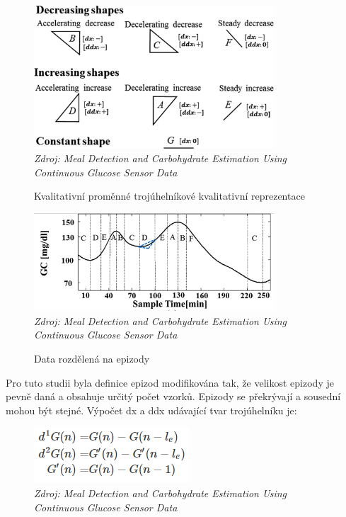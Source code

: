 \begin{figure}[H]
\caption{Kvalitativní proměnné trojúhelníkové kvalitativní reprezentace}
\label{fig:wavelet1}
\centering
\includegraphics[width=0.8\textwidth]{img/analyza/wavelet1.png}\\
\textit{Zdroj: Meal Detection and Carbohydrate Estimation Using Continuous Glucose Sensor Data \citep{Analyza.WaveletEst}}
\end{figure}
\begin{figure}[H]
\caption{Data rozdělená na epizody}
\label{fig:wavelet2}
\centering
\includegraphics[width=0.8\textwidth]{img/analyza/wavelet2.png}\\
\textit{Zdroj: Meal Detection and Carbohydrate Estimation Using Continuous Glucose Sensor Data \citep{Analyza.WaveletEst}}
\end{figure}

Pro tuto studii byla definice epizod modifikována tak, že velikost epizody je pevně daná a obsahuje určitý počet vzorků. Epizody se překrývají a sousední mohou být stejné. Výpočet dx a ddx udávající tvar trojúhelníku je:

\begin{figure}[H]
\label{fig:wavelet3}
\includegraphics{img/analyza/wavelet3.png}\\
\textit{Zdroj: Meal Detection and Carbohydrate Estimation Using Continuous Glucose Sensor Data \citep{Analyza.WaveletEst}}
\end{figure}

